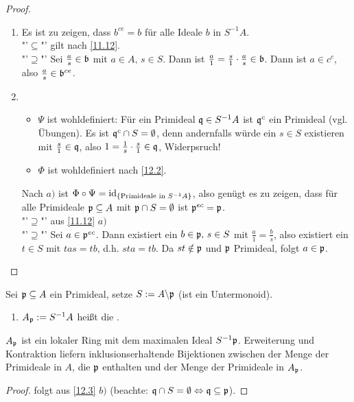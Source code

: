 \begin{proof}
	\begin{enumerate}[label= \alph*)]
		\item Es ist zu zeigen, dass $b^{ce} = b$ für alle Ideale $b$ in $S^{-1}A$.\\
		"'$\subseteq$"' gilt nach \ref{11.12}.\\
		"'$\supseteq$"' Sei $\frac{a}{s}\in \mathfrak{b}$ mit $a\in A, \, s\in S$. Dann ist $\frac{a}{1} = \frac{s}{1} \cdot \frac{a}{s} \in \mathfrak{b}$. Dann ist $a\in c^c$, also $\frac{a}{s} \in \mathfrak{b}^{ce}$.
		\item \begin{itemize}
			\item $\Psi$ ist wohldefiniert: Für ein Primideal $\mathfrak{q}\in S^{-1}A$ ist $\mathfrak{q}^c$ ein Primideal (vgl. Übungen). Es ist $\mathfrak{q}^c\cap S=\emptyset$, denn andernfalls würde ein $s\in S$ existieren mit $\frac{s}{1} \in\mathfrak{q} $, also $1 = \frac{1}{s} \cdot \frac{s}{1}\in \mathfrak{q}$, Widerpsruch!
			\item $\Phi$ ist wohldefiniert nach \ref{12.2}.
		\end{itemize}
	Nach $a)$ ist $\Phi \circ \Psi=\operatorname{id}_{\{\text{Primideale in } S^{-1}A\}}$, also genügt es zu zeigen, dass für alle Primideale $\mathfrak{p} \subseteq A$ mit $\mathfrak{p} \cap S= \emptyset$ ist $\mathfrak{p}^{ec} = \mathfrak{p}$.\\
	"'$\supseteq$"' aus \ref{11.12} $a)$\\
	"'$\supseteq$"' Sei $a\in \mathfrak{p}^{ec}$. Dann existiert ein $b\in \mathfrak{p}, \, s\in S$ mit $\frac{a}{1} = \frac{b}{s}$, also existiert ein $t\in S$ mit $tas = tb$, d.h. $sta=tb$. Da $st\notin \mathfrak{p}$ und $\mathfrak{p}$ Primideal, folgt $a\in \mathfrak{p}$.
	\end{enumerate}
\end{proof}
\begin{bem+df}\label{12.4}
	Sei $\mathfrak{p}\subseteq A$ ein Primideal, setze $S:= A\backslash \mathfrak{p}$ (ist ein Untermonoid).
	\begin{enumerate}
		\item[] $A_{\mathfrak{p}}:= S^{-1}A$ heißt die .
	\end{enumerate}
	$A_{\mathfrak{p}}$ ist ein lokaler Ring mit dem maximalen Ideal $S^{-1} \mathfrak{p}$. Erweiterung und Kontraktion liefern inklusionserhaltende Bijektionen zwischen der Menge der Primideale in $A$, die $\mathfrak{p}$ enthalten und der Menge der Primideale in $A_{\mathfrak{p}}$.
\end{bem+df}
\begin{proof}
	folgt aus \ref{12.3} $b)$ (beachte: $\mathfrak{q} \cap S= \emptyset \Leftrightarrow \mathfrak{q} \subseteq \mathfrak{p}$).
\end{proof}
